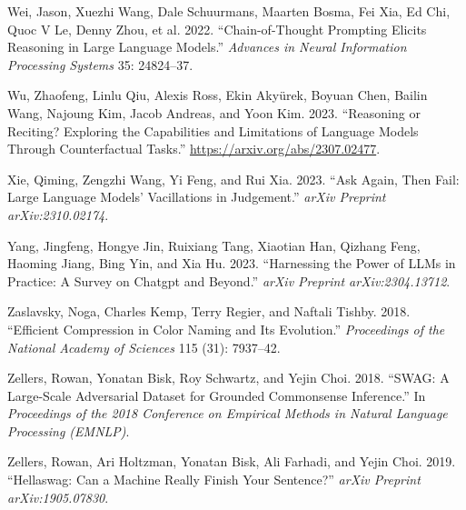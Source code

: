 \documentclass[
]{article}
\newlength{\cslhangindent}
\newenvironment{CSLReferences}[2] %
 {\begin{list}{}{%
  \setlength{\itemindent}{0pt}
  \setlength{\leftmargin}{0pt}
  \setlength{\parsep}{0pt}
  \ifodd #1
   \setlength{\leftmargin}{\cslhangindent}
   \setlength{\itemindent}{-1\cslhangindent}
  \fi
  \setlength{\itemsep}{#2\baselineskip}}}
 {\end{list}}
\theoremstyle{plain}
\theoremstyle{definition}
\theoremstyle{remark}
\begin{document}
\begin{CSLReferences}{1}{0}
Wei, Jason, Xuezhi Wang, Dale Schuurmans, Maarten Bosma, Fei Xia, Ed
Chi, Quoc V Le, Denny Zhou, et al. 2022. {``Chain-of-Thought Prompting
Elicits Reasoning in Large Language Models.''} \emph{Advances in Neural
Information Processing Systems} 35: 24824--37.

Wu, Zhaofeng, Linlu Qiu, Alexis Ross, Ekin Akyürek, Boyuan Chen, Bailin
Wang, Najoung Kim, Jacob Andreas, and Yoon Kim. 2023. {``Reasoning or
Reciting? Exploring the Capabilities and Limitations of Language Models
Through Counterfactual Tasks.''} \url{https://arxiv.org/abs/2307.02477}.

Xie, Qiming, Zengzhi Wang, Yi Feng, and Rui Xia. 2023. {``Ask Again,
Then Fail: Large Language Models' Vacillations in Judgement.''}
\emph{arXiv Preprint arXiv:2310.02174}.

Yang, Jingfeng, Hongye Jin, Ruixiang Tang, Xiaotian Han, Qizhang Feng,
Haoming Jiang, Bing Yin, and Xia Hu. 2023. {``Harnessing the Power of
LLMs in Practice: A Survey on Chatgpt and Beyond.''} \emph{arXiv
Preprint arXiv:2304.13712}.

Zaslavsky, Noga, Charles Kemp, Terry Regier, and Naftali Tishby. 2018.
{``Efficient Compression in Color Naming and Its Evolution.''}
\emph{Proceedings of the National Academy of Sciences} 115 (31):
7937--42.

Zellers, Rowan, Yonatan Bisk, Roy Schwartz, and Yejin Choi. 2018.
{``SWAG: A Large-Scale Adversarial Dataset for Grounded Commonsense
Inference.''} In \emph{Proceedings of the 2018 Conference on Empirical
Methods in Natural Language Processing (EMNLP)}.

Zellers, Rowan, Ari Holtzman, Yonatan Bisk, Ali Farhadi, and Yejin Choi.
2019. {``Hellaswag: Can a Machine Really Finish Your Sentence?''}
\emph{arXiv Preprint arXiv:1905.07830}.

\end{CSLReferences}
\end{document}
